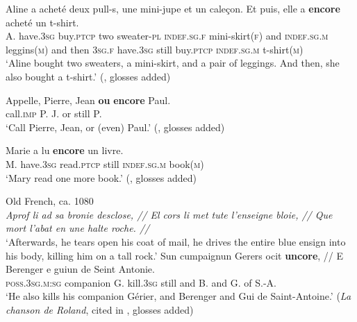 \begin{exe}

	\ex \label{exAppendixFrenchAdditiveTShirt}
	\gll Aline a acheté deux pull-s, une mini-jupe et un caleçon. Et puis, elle a \textbf{encore} acheté un t-shirt.\\
	A. have.3\textsc{sg} buy.\textsc{ptcp} two sweater-\textsc{pl} \textsc{indef}.\textsc{sg}.\textsc{f} mini-skirt(\textsc{f}) and \textsc{indef}.\textsc{sg}.\textsc{m} leggins(\textsc{m}) and then 3\textsc{sg}.\textsc{f} have.3\textsc{sg} still buy.\textsc{ptcp} \textsc{indef}.\textsc{sg}.\textsc{m} t-shirt(\textsc{m})\\
	\glt \lq Aline bought two sweaters, a mini-skirt, and a pair of leggings. And then, she also bought a t-shirt.\rq{ }(\cite[157]{MosegaardHansen2008}, glosses added)

	\ex\label{exAppendixFrenchEncoreAdditiveLastInSeries}
	 \gll Appelle, Pierre, Jean \textbf{ou} \textbf{encore} Paul.\\
	call.\textsc{imp} P. J. or still P.\\
	\glt \lq Call Pierre, Jean, or (even) Paul.' (\cite[40]{Borillo1984}, glosses added)
		
	\ex
	\gll Marie a lu \textbf{encore} un livre.\\
	M. have.3\textsc{sg} read.\textsc{ptcp} still \textsc{indef}.\textsc{sg}.\textsc{m} book(\textsc{m})\\
	\glt \lq Mary read one more book.' (\cite[9]{TovenaDonazzan2008}, glosses added)
	
	\ex Old French, ca. 1080\label{exAppendixFrenchEncoreAdditiveOld}\\
\textit{Aprof li ad sa bronie desclose, // El cors li met tute l’enseigne bloie, // Que mort l’abat en une halte roche. //} \\
	\lq Afterwards, he tears open his coat of mail, he drives the entire blue ensign into his body, killing him on a tall rock.'
	\exi{}\gll Sun cumpaignun Gerers ocit \textbf{uncore}, // E Berenger e guiun de Seint Antonie.\\
	\textsc{poss}.3\textsc{sg}.\textsc{m}:\textsc{sg} companion G. kill.3\textsc{sg} still {} and B. and G. of S.-A.\\
	\glt \lq He also kills his companion Gérier, and Berenger and Gui de Saint-Antoine.' (\textit{La chanson de Roland}, cited in \cite[158]{MosegaardHansen2008}, glosses added)	
	

\end{exe}
